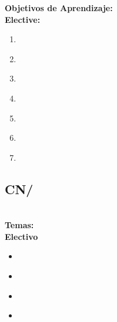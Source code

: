 \noindent \textbf{Objetivos de Aprendizaje:}\\
\noindent \textbf{Elective:}
\begin{enumerate}
	\setcounter{enumi}{0}
	\item \CNDataInformationandKnowledgeLOIdentifyAll\xspace[\CNDataInformationandKnowledgeLOIdentifyAllLevel]\label{sec:BOK:CNDataInformationandKnowledgeLOIdentifyAll}
	\item \CNDataInformationandKnowledgeLODescribeHowData\xspace[\CNDataInformationandKnowledgeLODescribeHowDataLevel]\label{sec:BOK:CNDataInformationandKnowledgeLODescribeHowData}
	\item \CNDataInformationandKnowledgeLODescribeTypical\xspace[\CNDataInformationandKnowledgeLODescribeTypicalLevel]\label{sec:BOK:CNDataInformationandKnowledgeLODescribeTypical}
	\item \CNDataInformationandKnowledgeLOSelectA\xspace[\CNDataInformationandKnowledgeLOSelectALevel]\label{sec:BOK:CNDataInformationandKnowledgeLOSelectA}
	\item \CNDataInformationandKnowledgeLOListAnd\xspace[\CNDataInformationandKnowledgeLOListAndLevel]\label{sec:BOK:CNDataInformationandKnowledgeLOListAnd}
	\item \CNDataInformationandKnowledgeLOCompareAndManagement\xspace[\CNDataInformationandKnowledgeLOCompareAndManagementLevel]\label{sec:BOK:CNDataInformationandKnowledgeLOCompareAndManagement}
	\item \CNDataInformationandKnowledgeLODesignAFor\xspace[\CNDataInformationandKnowledgeLODesignAForLevel]\label{sec:BOK:CNDataInformationandKnowledgeLODesignAFor}
\end{enumerate}


\subsection{CN/\CNNumericalAnalysis}\label{sec:BOK:CNNumericalAnalysis}
\CNNumericalAnalysisDescription\\
\noindent \textbf{Temas:}\\
\noindent \textbf{Electivo}
\begin{itemize}
	\item \CNNumericalAnalysisTopicError\label{sec:BOK:CNNumericalAnalysisTopicError}
	\item \CNNumericalAnalysisTopicFunction\label{sec:BOK:CNNumericalAnalysisTopicFunction}
	\item \CNNumericalAnalysisTopicNumerical\label{sec:BOK:CNNumericalAnalysisTopicNumerical}
	\item \CNNumericalAnalysisTopicDifferential\label{sec:BOK:CNNumericalAnalysisTopicDifferential}
\end{itemize}


